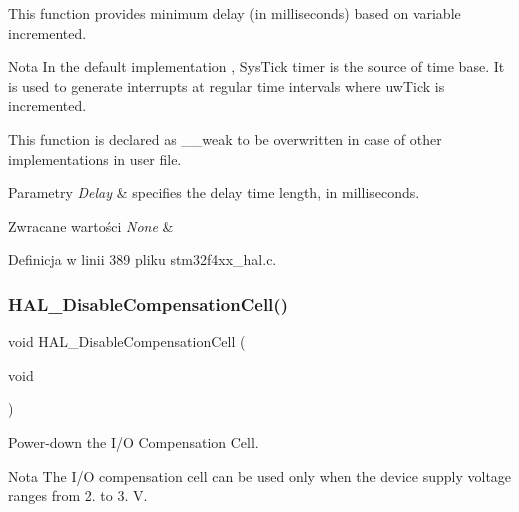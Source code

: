 This function provides minimum delay (in milliseconds) based on variable incremented. 

\begin{DoxyNote}{Nota}
In the default implementation , Sys\+Tick timer is the source of time base. It is used to generate interrupts at regular time intervals where uw\+Tick is incremented. 

This function is declared as \+\_\+\+\_\+weak to be overwritten in case of other implementations in user file. 
\end{DoxyNote}

\begin{DoxyParams}{Parametry}
{\em Delay} & specifies the delay time length, in milliseconds. \\
\hline
\end{DoxyParams}

\begin{DoxyRetVals}{Zwracane wartości}
{\em None} & \\
\hline
\end{DoxyRetVals}


Definicja w linii 389 pliku stm32f4xx\+\_\+hal.\+c.

\mbox{\label{group___h_a_l___exported___functions___group2_ga653f1166b0e37afd40372550d806e667}} 
\subsubsection{\texorpdfstring{H\+A\+L\+\_\+\+Disable\+Compensation\+Cell()}{HAL\_DisableCompensationCell()}}
{\footnotesize\ttfamily void H\+A\+L\+\_\+\+Disable\+Compensation\+Cell (\begin{DoxyParamCaption}\item[{void}]{ }\end{DoxyParamCaption})}



Power-\/down the I/O Compensation Cell. 

\begin{DoxyNote}{Nota}
The I/O compensation cell can be used only when the device supply voltage ranges from 2. to 3. V. 
\end{DoxyNote}

